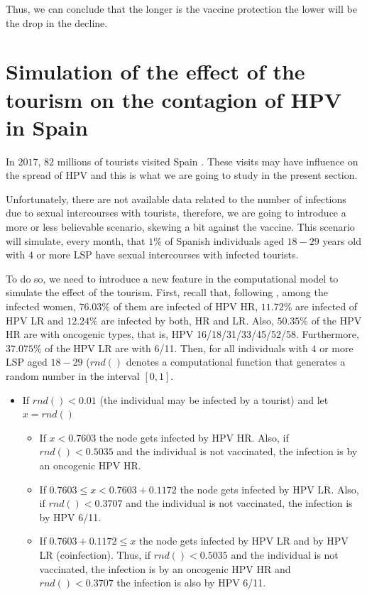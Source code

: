 Thus, we can conclude that the longer is the vaccine protection the lower will be the drop in the decline. 

\section{Simulation of the effect of the tourism on the contagion of HPV in Spain}
In $2017$, $82$ millions of tourists visited Spain \cite{INEturismo}. These visits may have influence on the spread of HPV and this is what we are going to study in the present section.

Unfortunately, there are not available data related to the number of infections due to sexual intercourses with tourists, therefore, we are going to introduce a more or less believable scenario, skewing a bit against the vaccine. This scenario will simulate, every month, that $1\%$ of Spanish individuals aged $18-29$ years old with $4$ or more LSP have sexual intercourses with infected tourists.

To do so, we need to introduce a new feature in the computational model to simulate the effect of the tourism. First, recall that, following \cite{castellsague2012prevalence}, among the infected women, $76.03\%$ of them are infected of HPV HR, $11.72\%$ are infected of HPV LR and $12.24\%$ are infected by both, HR and LR. Also, $50.35\%$ of the HPV HR are with oncogenic types, that is, HPV 16/18/31/33/45/52/58. Furthermore, $37.075\%$ of the HPV LR are with 6/11. Then, for all individuals with $4$ or more LSP aged $18-29$ ($rnd()$ denotes a computational function that generates a random number in the interval $[0,1]$.

\begin{itemize}
	\item If $rnd()<0.01$ (the individual may be infected by a tourist) and let $x=rnd()$
	\begin{itemize}
		\item If $x < 0.7603$ the node gets infected by HPV HR. Also, if $rnd() < 0.5035$ and the individual is not vaccinated, the infection is by an oncogenic HPV HR.
		\item If $0.7603 \leq x < 0.7603 + 0.1172$ the node gets infected by HPV LR. Also, if $rnd() < 0.3707$ and the individual is not vaccinated, the infection is by HPV 6/11.
		\item If $0.7603 + 0.1172 \leq x $ the node gets infected by HPV LR and by HPV LR (coinfection). Thus, if $rnd() < 0.5035$ and the individual is not vaccinated, the infection is by an oncogenic HPV HR and $rnd() < 0.3707$ the infection is also by HPV 6/11.
	\end{itemize}
\end{itemize}

